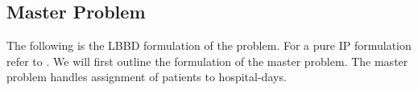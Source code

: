 \subsection{Master Problem} 

The following is the LBBD formulation of the problem.
For a pure IP formulation refer to \cite{roshanaei2017propagating}. We will first outline
the formulation of the master problem. The master problem handles assignment of patients
to hospital-days.

\begin{table}[H]
\caption*{\bf{SETS}}

\end{table}

